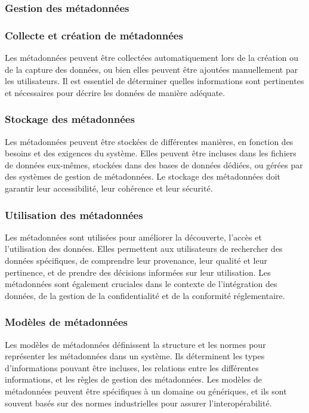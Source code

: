\documentclass{article}
\begin{document}
	\subsubsection{Gestion des métadonnées}
	\subsubsection{Collecte et création de métadonnées}
	Les métadonnées peuvent être collectées automatiquement lors de la création ou de la capture des données, ou bien elles peuvent être ajoutées manuellement par les utilisateurs. Il est essentiel de déterminer quelles informations sont pertinentes et nécessaires pour décrire les données de manière adéquate.
	
	\subsubsection{Stockage des métadonnées}
	Les métadonnées peuvent être stockées de différentes manières, en fonction des besoins et des exigences du système. Elles peuvent être incluses dans les fichiers de données eux-mêmes, stockées dans des bases de données dédiées, ou gérées par des systèmes de gestion de métadonnées. Le stockage des métadonnées doit garantir leur accessibilité, leur cohérence et leur sécurité.
	
	\subsubsection{Utilisation des métadonnées}
	Les métadonnées sont utilisées pour améliorer la découverte, l’accès et l’utilisation des données. Elles permettent aux utilisateurs de rechercher des données spécifiques, de comprendre leur provenance, leur qualité et leur pertinence, et de prendre des décisions informées sur leur utilisation. Les métadonnées sont également cruciales dans le contexte de l’intégration des données, de la gestion de la confidentialité et de la conformité réglementaire.
	
	\subsubsection{Modèles de métadonnées}
	Les modèles de métadonnées définissent la structure et les normes pour représenter les métadonnées dans un système. Ils déterminent les types d’informations pouvant être incluses, les relations entre les différentes informations, et les règles de gestion des métadonnées. Les modèles de métadonnées peuvent être spécifiques à un domaine ou génériques, et ils sont souvent basés sur des normes industrielles pour assurer l’interopérabilité.
	
\end{document}
